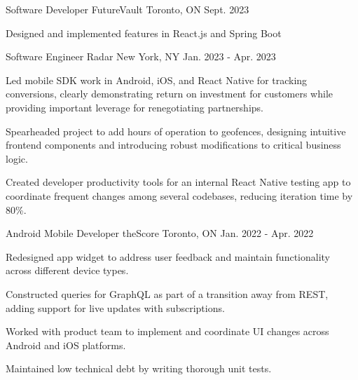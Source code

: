 

\begin{cventries}

  \cventry
    {Software Developer} %
    {FutureVault} %
    {Toronto, ON} %
    {Sept. 2023} %
    {
      \begin{cvitems} %
        \item {Designed and implemented features in React.js and Spring Boot}
      \end{cvitems}
    }

  \cventry
    {Software Engineer} %
    {Radar} %
    {New York, NY} %
    {Jan. 2023 - Apr. 2023} %
    {
      \begin{cvitems} %
        \item {Led mobile SDK work in Android, iOS, and React Native for tracking conversions, clearly demonstrating return on investment for customers while providing important leverage for renegotiating partnerships.}
        \item {Spearheaded project to add hours of operation to geofences, designing intuitive frontend components and introducing robust modifications to critical business logic.}
        \item {Created developer productivity tools for an internal React Native testing app to coordinate frequent changes among several codebases, reducing iteration time by 80\%.}
      \end{cvitems}
    }

  \cventry
    {Android Mobile Developer} %
    {theScore} %
    {Toronto, ON} %
    {Jan. 2022 - Apr. 2022} %
    {
      \begin{cvitems} %
        \item {Redesigned app widget to address user feedback and maintain functionality across different device types.}
        \item {Constructed queries for GraphQL as part of a transition away from REST, adding support for live updates with subscriptions.}
        \item {Worked with product team to implement and coordinate UI changes across Android and iOS platforms.}
        \item {Maintained low technical debt by writing thorough unit tests.}
      \end{cvitems}
    }


\end{cventries}
